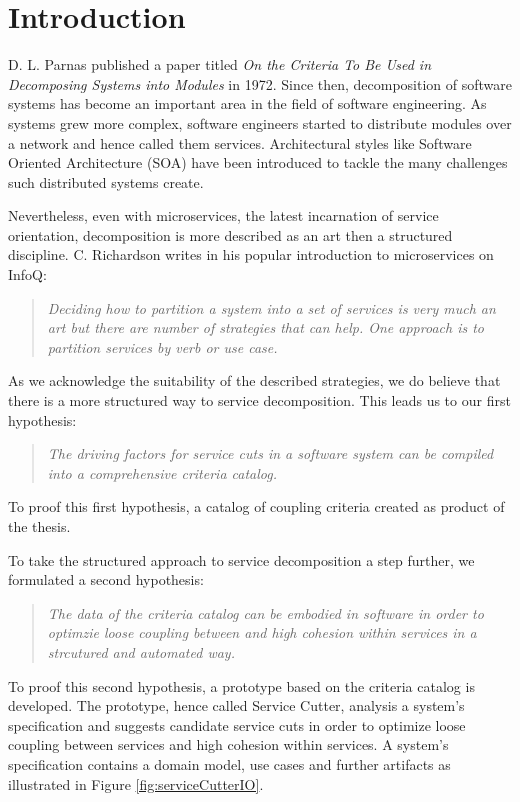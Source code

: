 \chapter{Introduction}

D. L. Parnas published a paper titled \textit{On the Criteria To Be Used in Decomposing Systems into Modules}\cite{parnaDecomposing} in 1972. Since then, decomposition of software systems has become an important area in the field of software engineering. As systems grew more complex, software engineers started to distribute modules over a network and hence called them services. Architectural styles like Software Oriented Architecture (SOA) have been introduced to tackle the many challenges such distributed systems create. 

Nevertheless, even with microservices, the latest incarnation of service orientation, decomposition is more described as an art then a structured discipline. C. Richardson writes in his popular introduction to microservices on InfoQ:

\begin{quote}
	\textit{Deciding how to partition a system into a set of services is very much an art but there are number of strategies that can help. One approach is to partition services by verb or use case.}\cite{richardson2014microservices}
\end{quote}

As we acknowledge the suitability of the described strategies, we do believe that there is a more structured way to service decomposition. This leads us to our first hypothesis:

\begin{quote}
	\textit{The driving factors for service cuts in a software system can be compiled into a comprehensive criteria catalog.}
\end{quote}

To proof this first hypothesis, a catalog of coupling criteria created as product of the thesis.

To take the structured approach to service decomposition a step further, we formulated a second hypothesis:

\begin{quote}
	\textit{The data of the criteria catalog can be embodied in software in order to optimzie loose coupling between and high cohesion within services in a strcutured and automated way.}
\end{quote}

To proof this second hypothesis, a prototype based on the criteria catalog is developed. The prototype, hence called Service Cutter, analysis a system's specification and suggests candidate service cuts in order to optimize loose coupling between services and high cohesion within services. A system's specification contains a domain model, use cases and further artifacts as illustrated in Figure \ref{fig:serviceCutterIO}.

